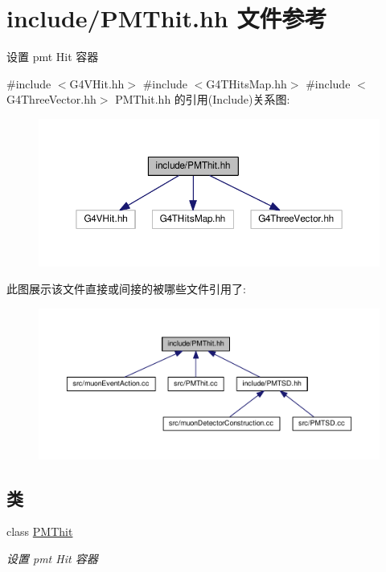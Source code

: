 \hypertarget{PMThit_8hh}{}\section{include/\+P\+M\+Thit.hh 文件参考}
\label{PMThit_8hh}


设置 pmt Hit 容器  


{\ttfamily \#include $<$G4\+V\+Hit.\+hh$>$}\newline
{\ttfamily \#include $<$G4\+T\+Hits\+Map.\+hh$>$}\newline
{\ttfamily \#include $<$G4\+Three\+Vector.\+hh$>$}\newline
P\+M\+Thit.\+hh 的引用(Include)关系图\+:\nopagebreak
\begin{figure}[H]
\begin{center}
\leavevmode
\includegraphics[width=350pt]{PMThit_8hh__incl}
\end{center}
\end{figure}
此图展示该文件直接或间接的被哪些文件引用了\+:\nopagebreak
\begin{figure}[H]
\begin{center}
\leavevmode
\includegraphics[width=350pt]{PMThit_8hh__dep__incl}
\end{center}
\end{figure}
\subsection*{类}
\begin{DoxyCompactItemize}
\item 
class \hyperlink{classPMThit}{P\+M\+Thit}
\begin{DoxyCompactList}\small\item\em 设置 pmt Hit 容器 \end{DoxyCompactList}\end{DoxyCompactItemize}
